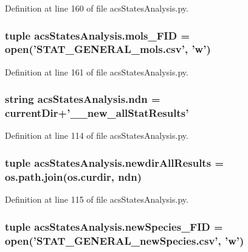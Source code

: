 Definition at line 160 of file acs\-States\-Analysis.\-py.

\hypertarget{a00098_a603a41889d8732146d44da83ffaf0489}{
\subsubsection[{mols\-\_\-\-F\-I\-D}]{\setlength{\rightskip}{0pt plus 5cm}tuple acs\-States\-Analysis.\-mols\-\_\-\-F\-I\-D = open('S\-T\-A\-T\-\_\-\-G\-E\-N\-E\-R\-A\-L\-\_\-mols.\-csv', 'w')}}\label{a00098_a603a41889d8732146d44da83ffaf0489}


Definition at line 161 of file acs\-States\-Analysis.\-py.

\hypertarget{a00098_a5e117df6e0cdffdae13947622c6c4890}{
\subsubsection[{ndn}]{\setlength{\rightskip}{0pt plus 5cm}string acs\-States\-Analysis.\-ndn = {\bf current\-Dir}+'\-\_\-\_\-new\-\_\-all\-Stat\-Results'}}\label{a00098_a5e117df6e0cdffdae13947622c6c4890}


Definition at line 114 of file acs\-States\-Analysis.\-py.

\hypertarget{a00098_a62d6cfd52b4428ab7ea4d75d43b2d49b}{
\subsubsection[{newdir\-All\-Results}]{\setlength{\rightskip}{0pt plus 5cm}tuple acs\-States\-Analysis.\-newdir\-All\-Results = os.\-path.\-join(os.\-curdir, {\bf ndn})}}\label{a00098_a62d6cfd52b4428ab7ea4d75d43b2d49b}


Definition at line 115 of file acs\-States\-Analysis.\-py.

\hypertarget{a00098_abdb6e583333cc08cac8c63631db80b5b}{
\subsubsection[{new\-Species\-\_\-\-F\-I\-D}]{\setlength{\rightskip}{0pt plus 5cm}tuple acs\-States\-Analysis.\-new\-Species\-\_\-\-F\-I\-D = open('S\-T\-A\-T\-\_\-\-G\-E\-N\-E\-R\-A\-L\-\_\-new\-Species.\-csv', 'w')}}\label{a00098_abdb6e583333cc08cac8c63631db80b5b}


